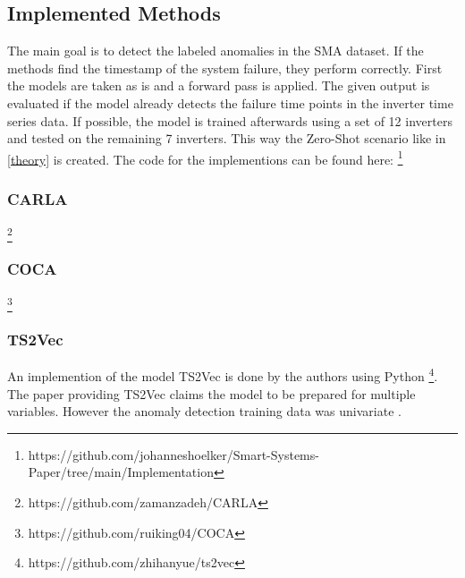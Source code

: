 
\subsection{Implemented Methods}
The main goal is to detect the labeled anomalies in the SMA dataset. If the methods find the timestamp of the system failure, they perform correctly. First the models are taken as is and a forward pass is applied. The given output is evaluated if the model already detects the failure time points in the inverter time series data. If possible, the model is trained afterwards using a set of 12 inverters and tested on the remaining 7 inverters. This way the Zero-Shot scenario like in \ref{theory} is created.
The code for the implementions can be found here: \footnote{\fussy\tiny https://github.com/johanneshoelker/Smart-Systems-Paper/tree/main/Implementation}


%

\subsubsection{CARLA}
\footnote{\fussy\tiny https://github.com/zamanzadeh/CARLA}

\subsubsection{COCA}
\footnote{\fussy\tiny https://github.com/ruiking04/COCA}

\subsubsection{TS2Vec}
An implemention of the model TS2Vec is done by the authors using Python \footnote{\fussy\tiny https://github.com/zhihanyue/ts2vec}.
The paper providing TS2Vec claims the model to be prepared for multiple variables. However the anomaly detection training data was univariate \cite{yue_ts2vec_2022}.

